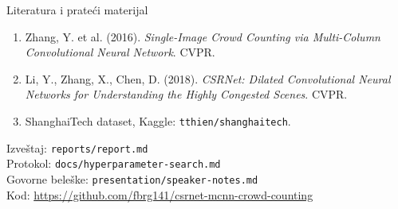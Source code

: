 \documentclass[aspectratio=169]{beamer}
\begin{document}
\begin{frame}{Literatura i prateći materijal}
\small
\begin{enumerate}
\item Zhang, Y. et al. (2016). \emph{Single-Image Crowd Counting via Multi-Column Convolutional Neural Network}. CVPR.
\item Li, Y., Zhang, X., Chen, D. (2018). \emph{CSRNet: Dilated Convolutional Neural Networks for Understanding the Highly Congested Scenes}. CVPR.
\item ShanghaiTech dataset, Kaggle: \texttt{tthien/shanghaitech}.
\end{enumerate}
\vspace{.4cm}
Izveštaj: \texttt{reports/report.md}\\
Protokol: \texttt{docs/hyperparameter-search.md}\\
Govorne beleške: \texttt{presentation/speaker-notes.md}\\
Kod: \url{https://github.com/fbrg141/csrnet-mcnn-crowd-counting}
\end{frame}
\end{document}
